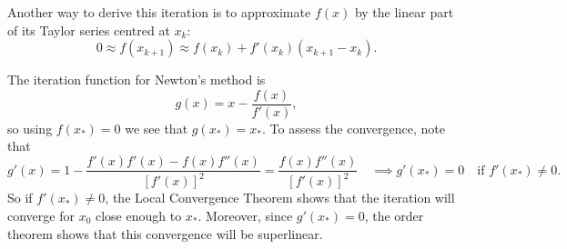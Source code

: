 \documentclass[
  letterpaper,
  DIV=11,
  numbers=noendperiod]{scrreprt}
\begin{document}
Another way to derive this iteration is to approximate \(f(x)\) by the
linear part of its Taylor series centred at \(x_k\): \[
0 \approx f(x_{k+1}) \approx f(x_k) + f'(x_k)(x_{k+1} - x_{k}).
\]

The iteration function for Newton's method is \[
g(x) = x - \frac{f(x)}{f'(x)},
\] so using \(f(x_*)=0\) we see that \(g(x_*)=x_*\). To assess the
convergence, note that \[
g'(x) = 1 - \frac{f'(x)f'(x) - f(x)f''(x)}{[f'(x)]^2} = \frac{f(x)f''(x)}{[f'(x)]^2} \quad \implies g'(x_*)=0 \quad \textrm{if $f'(x_*)\neq 0$}.
\] So if \(f'(x_*)\neq 0\), the Local Convergence Theorem shows that the
iteration will converge for \(x_0\) close enough to \(x_*\). Moreover,
since \(g'(x_*)=0\), the order theorem shows that this convergence will
be superlinear.

\label{calculate-a-1-using-fxfrac1x---a-for-a0.}
\end{document}
